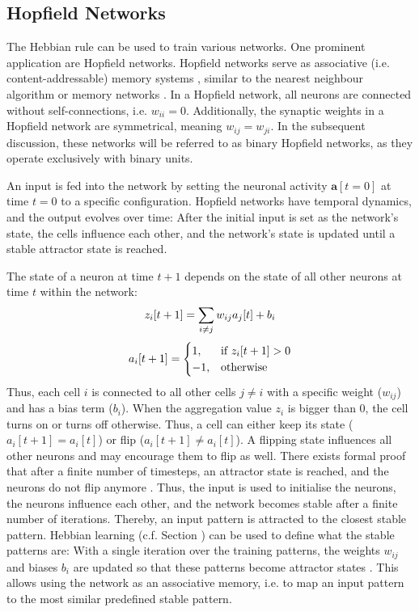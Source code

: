 \subsection{Hopfield Networks}
The Hebbian rule can be used to train various networks.
One prominent application are Hopfield networks.
Hopfield networks serve as associative (i.e. content-addressable) memory systems , similar to the nearest neighbour algorithm  or memory networks .
In a Hopfield network, all neurons are connected without self-connections, i.e. $w_{ii}=0$.
Additionally, the synaptic weights in a Hopfield network are symmetrical, meaning \(w_{ij} = w_{ji}\).
In the subsequent discussion, these networks will be referred to as binary Hopfield networks, as they operate exclusively with binary units.

An input is fed into the network by setting the neuronal activity $\boldsymbol{a}[t=0]$ at time $t=0$ to a specific configuration.
Hopfield networks have temporal dynamics, and the output evolves over time: After the initial input is set as the network's state, the cells influence each other, and the network's state is updated until a stable attractor state is reached.

The state of a neuron at time $t+1$ depends on the state of all other neurons at time $t$ within the network:
%
\begin{align}\eqlbl{hf_1}
	z_i[t+1] = \sum_{i \neq j} w_{ij} a_j[t] + b_i
\end{align}
%
\begin{align}\eqlbl{hf_2}
	a_i[t+1] = \begin{cases}
      		1, & \text{if } z_i[t+1] > 0 \\
      		-1, & \text{otherwise}
    	\end{cases}
\end{align}
%
Thus, each cell $i$ is connected to all other cells $j \neq i$ with a specific weight ($w_{ij}$) and has a bias term ($b_i$). 
When the aggregation value $z_i$ is bigger than $0$, the cell turns on or turns off otherwise.
Thus, a cell can either keep its state ($a_i[t+1] = a_i[t]$) or flip ($a_i[t+1] \neq a_i[t]$).
A flipping state influences all other neurons and may encourage them to flip as well.
There exists formal proof that after a finite number of timesteps, an attractor state is reached, and the neurons do not flip anymore .
Thus, the input is used to initialise the neurons, the neurons influence each other, and the network becomes stable after a finite number of iterations. Thereby, an input pattern is attracted to the closest stable pattern.
Hebbian learning (c.f. Section ) can be used to define what the stable patterns are:
With a single iteration over the training patterns, the weights $w_{ij}$ and biases $b_i$ are updated so that these patterns become attractor states .
This allows using the network as an associative memory, i.e. to map an input pattern to the most similar predefined stable pattern.

